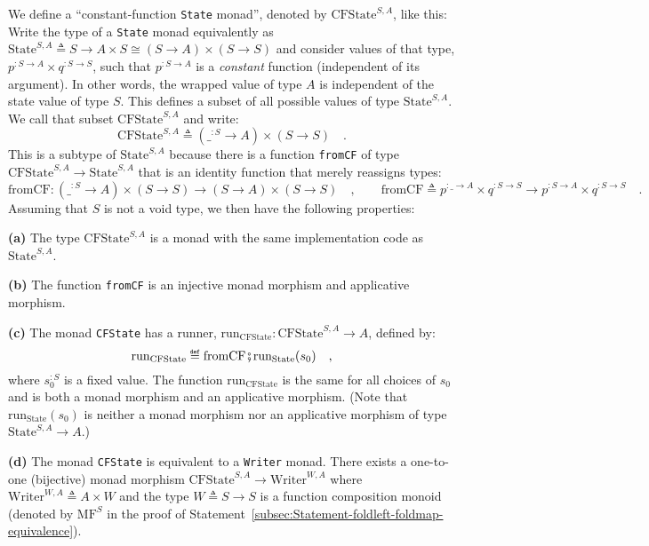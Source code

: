 We define a \textsf{``}constant-function \lstinline!State! monad\textsf{''}, denoted
by $\text{CFState}^{S,A}$, like this: Write the type of a \lstinline!State!
monad equivalently as $\text{State}^{S,A}\triangleq S\rightarrow A\times S\cong(S\rightarrow A)\times(S\rightarrow S)$
and consider values of that type, $p^{:S\rightarrow A}\times q^{:S\rightarrow S}$,
such that $p^{:S\rightarrow A}$ is a\emph{ constant} function (independent
of its argument). In other words, the wrapped value of type $A$ is
independent of the state value of type $S$. This defines a subset
of all possible values of type $\text{State}^{S,A}$. We call that
subset $\text{CFState}^{S,A}$ and write: 
\[
\text{CFState}^{S,A}\triangleq(\_^{:S}\rightarrow A)\times(S\rightarrow S)\quad.
\]
This is a subtype of $\text{State}^{S,A}$ because there is a function
\lstinline!fromCF! of type $\text{CFState}^{S,A}\rightarrow\text{State}^{S,A}$
that is an identity function that merely reassigns types:
\[
\text{fromCF}:(\_^{:S}\rightarrow A)\times(S\rightarrow S)\rightarrow(S\rightarrow A)\times(S\rightarrow S)\quad,\quad\quad\text{fromCF}\triangleq p^{:\_\rightarrow A}\times q^{:S\rightarrow S}\rightarrow p^{:S\rightarrow A}\times q^{:S\rightarrow S}\quad.
\]
Assuming that $S$ is not a void type, we then have the following
properties:

\textbf{(a)} The type $\text{CFState}^{S,A}$ is a monad with the
same implementation code as $\text{State}^{S,A}$.

\textbf{(b)} The function \lstinline!fromCF! is an injective monad
morphism and applicative morphism.

\textbf{(c)} The monad \lstinline!CFState! has a runner, $\text{run}_{\text{CFState}}:\text{CFState}^{S,A}\rightarrow A$,
defined by:
\[
\text{run}_{\text{CFState}}\triangleq\text{fromCF}\bef\text{run}_{\text{State}}(s_{0})\quad,
\]
where $s_{0}^{:S}$ is a fixed value. The function $\text{run}_{\text{CFState}}$
is the same for all choices of $s_{0}$ and is both a monad morphism
and an applicative morphism. (Note that $\text{run}_{\text{State}}(s_{0})$
is neither a monad morphism nor an applicative morphism of type $\text{State}^{S,A}\rightarrow A$.) 

\textbf{(d)} The monad \lstinline!CFState! is equivalent to a \lstinline!Writer!
monad. There exists a one-to-one (bijective) monad morphism $\text{CFState}^{S,A}\rightarrow\text{Writer}^{W,A}$
where $\text{Writer}^{W,A}\triangleq A\times W$ and the type $W\triangleq S\rightarrow S$
is a function composition monoid (denoted by $\text{MF}^{S}$ in the
proof of Statement~\ref{subsec:Statement-foldleft-foldmap-equivalence}).

